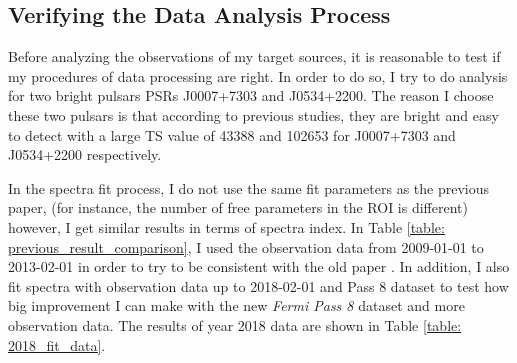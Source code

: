 \documentclass[12pt]{report}
\begin{document}
        \subsection{Verifying the Data Analysis Process}
          Before analyzing the observations of my target sources, it is reasonable to test 
          if my procedures of data processing are right. In order to do so, I try to do 
          analysis for two bright pulsars PSRs J0007+7303 and J0534+2200. The reason I choose 
          these two pulsars is that according to previous studies, they are bright and easy 
          to detect with a large TS value of 43388 and 102653 for J0007+7303 and J0534+2200 
          respectively. \cite{0067-0049-208-2-17} 

          In the spectra fit process, I do not use the same fit parameters as the previous 
          paper, (for instance, the number of free parameters in the ROI is different)
          however, I get similar results in terms of spectra index.  
          In Table \ref{table: previous_result_comparison}, I used the observation data from 
          2009-01-01 to 2013-02-01 in order to try to be consistent with the old paper 
          \cite{0067-0049-208-2-17}. In addition, I also fit spectra with observation data up 
          to 2018-02-01 and Pass 8 dataset to test how big improvement I can make with the 
          new \textit{Fermi Pass 8} dataset and more observation data. 
          The results of year 2018 data are shown in Table \ref{table: 2018_fit_data}.
\end{document}

